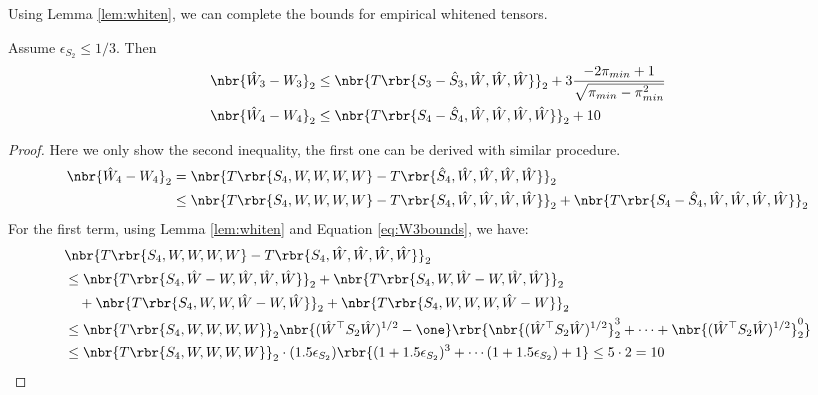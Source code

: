 \documentclass[twoside,11pt]{article}
\begin{document}
{Using Lemma \ref{lem:whiten}, we can complete the bounds for empirical whitened tensors.
\begin{lemma}{}
  \label{lem:Wbounds}
Assume $\epsilon_{S_2} \leq 1/3.$ Then
  \begin{align*}
    &\nbr{\hat{W}_3- W_3  }_2\leq \nbr{T\rbr{S_3- \hat{S}_3,\hat{W}, \hat{W},\hat{W}} }_2 + 3  \frac{-2\pi_{min}+1}{\sqrt{\pi_{min}-\pi_{min}^2}} \\
    &\nbr{\hat{W}_4- W_4 }_2\leq \nbr{T\rbr{S_4- \hat{S}_4,\hat{W}, \hat{W},\hat{W},\hat{W}} }_2 + 10
  \end{align*}
\end{lemma}
\begin{proof}
Here we only show the second inequality, the first one can be derived with similar procedure. 
  \begin{align}
    \nbr{\hat{W}_4- W_4 }_2 &= \nbr{T\rbr{S_4,W, W,W,W} -T\rbr{ \hat{S}_4,\hat{W},\hat{W}, \hat{W},\hat{W}} }_2\nonumber \\
    &\leq \nbr{T\rbr{S_4,W, W,W,W} -T\rbr{S_4,\hat{W},\hat{W}, \hat{W},\hat{W}} }_2 + \nbr{T\rbr{S_4-\hat{S}_4,\hat{W},\hat{W}, \hat{W},\hat{W}} }_2
  \end{align}
For the first term, using Lemma \ref{lem:whiten} and Equation \eqref{eq:W3bounds}, we have:
  \begin{align}
    &\nbr{T\rbr{S_4,W, W,W,W} -T\rbr{S_4,\hat{W},\hat{W}, \hat{W},\hat{W}} }_2\nonumber\\
     &\leq  \nbr{T\rbr{S_4,\hat{W}-W,\hat{W}, \hat{W},\hat{W}} }_2 +\nbr{T\rbr{S_4,W,\hat{W}-W, \hat{W},\hat{W}} }_2\nonumber\\ 
  &\,\,\,\,\,\,+\nbr{T\rbr{S_4,W,W, \hat{W}-W,\hat{W}} }_2+\nbr{T\rbr{S_4,W,W, W,\hat{W}-W} }_2\\
 &\leq \nbr{T\rbr{S_4,W,W,W,W} }_2\nbr{(\hat{W}^\top S_2\hat{W})^{1/2}-\one }\rbr{\nbr{(\hat{W}^\top S_2\hat{W})^{1/2}}_2^3+\cdots+\nbr{(\hat{W}^\top S_2\hat{W})^{1/2}}_2^0}\nonumber\\
 &\leq \nbr{T\rbr{S_4,W,W,W,W} }_2 \cdot (1.5 \epsilon_{S_2}) \rbr{(1+1.5 \epsilon_{S_2})^3+\cdots(1+1.5 \epsilon_{S_2})+1 } \leq 5 \cdot 2 = 10
  \end{align}
\end{proof}
}
\end{document}
